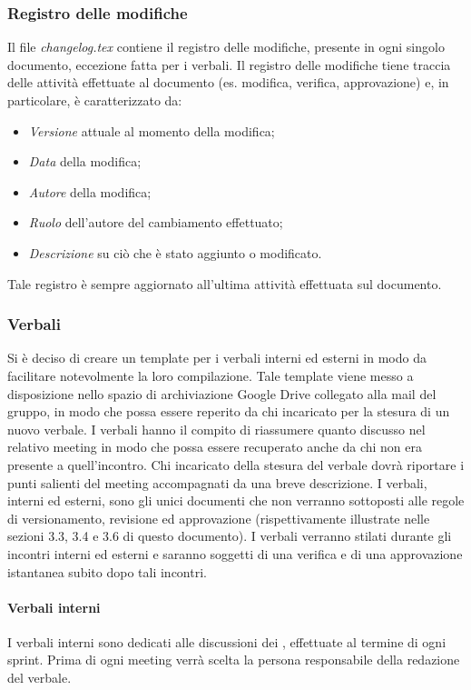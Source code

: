 \subsubsection{Registro delle modifiche}
Il file \textit{changelog.tex} contiene il registro delle modifiche, presente in ogni singolo documento, eccezione fatta per i verbali. 
Il registro delle modifiche tiene traccia delle attività effettuate al documento (es. modifica, verifica, approvazione) e, in particolare, è caratterizzato da:
\begin{itemize}
\item \textit{Versione} attuale al momento della modifica;
\item \textit{Data} della modifica;
\item \textit{Autore} della modifica;
\item \textit{Ruolo} dell'autore del cambiamento effettuato;
\item \textit{Descrizione} su ciò che è stato aggiunto o modificato.
\end{itemize}
Tale registro è sempre aggiornato all'ultima attività effettuata sul documento.

\subsubsection{Verbali}
Si è deciso di creare un template per i verbali interni ed esterni in modo da facilitare notevolmente la loro compilazione. Tale template viene messo a disposizione nello spazio di archiviazione  Google Drive\glo{} collegato alla mail del gruppo, in modo che possa essere reperito da chi incaricato per la stesura di un nuovo verbale.
I verbali hanno il compito di riassumere quanto discusso nel relativo meeting in modo che possa essere recuperato anche da chi non era presente a quell'incontro.
Chi incaricato della stesura del verbale dovrà riportare i punti salienti del meeting accompagnati da una breve descrizione.
I verbali, interni ed esterni, sono gli unici documenti che non verranno sottoposti alle regole di versionamento, revisione ed approvazione (rispettivamente illustrate nelle sezioni 3.3, 3.4 e
3.6 di questo documento). I verbali verranno stilati durante gli incontri interni ed esterni e saranno soggetti di una verifica e di una approvazione istantanea subito dopo tali incontri.

\paragraph{Verbali interni}
I verbali interni sono dedicati alle discussioni dei \groupName{}, effettuate al termine di ogni sprint. Prima di ogni meeting verrà scelta la persona responsabile della redazione del verbale. 


